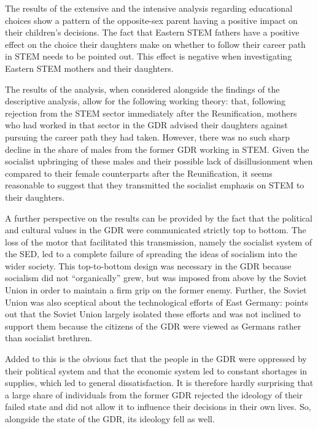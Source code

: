 \documentclass[a4paper, oneside, hyperfootnotes = false]{article}
\begin{document}
{The results of the extensive and the intensive analysis regarding educational choices show a pattern of the opposite-sex parent having a positive impact on their children's decisions.
The fact that Eastern STEM fathers have a positive effect on the choice their daughters make on whether to follow their career path in STEM needs to be pointed out.
This effect is negative when investigating Eastern STEM mothers and their daughters.

The results of the analysis, when considered alongside the findings of the descriptive analysis, allow for the following working theory:
that, following rejection from the STEM sector immediately after the Reunification, mothers who had worked in that sector in the GDR advised their daughters against pursuing the career path they had taken.
However, there was no such sharp decline in the share of males from the former GDR working in STEM.
Given the socialist upbringing of these males and their possible lack of disillusionment when compared to their female counterparts after the Reunification, it seems reasonable to suggest that they transmitted the socialist emphasis on STEM to their daughters.

A further perspective on the results can be provided by the fact that the political and cultural values in the GDR were communicated strictly top to bottom.
The loss of the motor that facilitated this transmission, namely the socialist system of the SED, led to a complete failure of spreading the ideas of socialism into the wider society.
This top-to-bottom design was necessary in the GDR because socialism did not ``organically'' grew, but was imposed from above by the Soviet Union in order to maintain a firm grip on the former enemy.
Further, the Soviet Union was also sceptical about the technological efforts of East Germany:
\cite{Hoegselius2009} points out that the Soviet Union largely isolated these efforts and was not inclined to support them because the citizens of the GDR were viewed as Germans rather than socialist brethren.

Added to this is the obvious fact that the people in the GDR were oppressed by their political system and that the economic system led to constant shortages in supplies, which led to general dissatisfaction.
It is therefore hardly surprising that a large share of individuals from the former GDR rejected the ideology of their failed state and did not allow it to influence their decisions in their own lives.
So, alongside the state of the GDR, its ideology fell as well.

}
\end{document}
